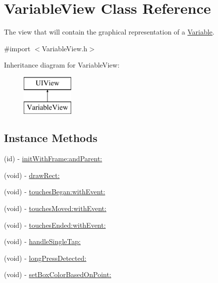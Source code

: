 \hypertarget{interface_variable_view}{\section{Variable\-View Class Reference}
\label{interface_variable_view}
}


The view that will contain the graphical representation of a \hyperlink{interface_variable}{Variable}.  




{\ttfamily \#import $<$Variable\-View.\-h$>$}

Inheritance diagram for Variable\-View\-:\begin{figure}[H]
\begin{center}
\leavevmode
\includegraphics[height=2.000000cm]{interface_variable_view}
\end{center}
\end{figure}
\subsection*{Instance Methods}
\begin{DoxyCompactItemize}
\item 
(id) -\/ \hyperlink{interface_variable_view_a1e7227b1d41e651a603e80315935a3ee}{init\-With\-Frame\-:and\-Parent\-:}
\item 
(void) -\/ \hyperlink{interface_variable_view_a8c03538769a6fcbd7aa8e672cf4b5c96}{draw\-Rect\-:}
\item 
(void) -\/ \hyperlink{interface_variable_view_a2357112d7fefe9f720ac82c881236830}{touches\-Began\-:with\-Event\-:}
\item 
(void) -\/ \hyperlink{interface_variable_view_a06bf1152e9fa0dd16bf7f46128ae0cff}{touches\-Moved\-:with\-Event\-:}
\item 
(void) -\/ \hyperlink{interface_variable_view_ad9cc995e0aa0c5e28ab827a06c897c36}{touches\-Ended\-:with\-Event\-:}
\item 
(void) -\/ \hyperlink{interface_variable_view_a38393b10eebe5376725616eb446df377}{handle\-Single\-Tap\-:}
\item 
(void) -\/ \hyperlink{interface_variable_view_ae1e3768fefe8a80686d2be0a8e21472f}{long\-Press\-Detected\-:}
\item 
(void) -\/ \hyperlink{interface_variable_view_abde0ec8a6fa1e0d26aa777c67b12dcac}{set\-Box\-Color\-Based\-On\-Point\-:}
\end{DoxyCompactItemize}

